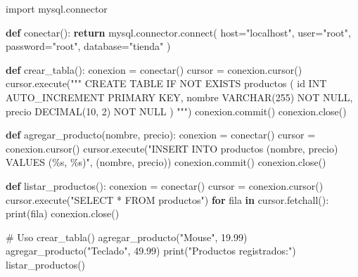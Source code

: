\documentclass[
  a4paper,
  DIV=11,
  numbers=noendperiod,
  onepage,
  openany]{scrreprt}
\newenvironment{Shaded}{\begin{snugshade}}{\end{snugshade}}
\newcommand{\BuiltInTok}[1]{\textcolor[rgb]{0.00,0.23,0.31}{#1}}
\newcommand{\CommentTok}[1]{\textcolor[rgb]{0.37,0.37,0.37}{#1}}
\newcommand{\ControlFlowTok}[1]{\textcolor[rgb]{0.00,0.23,0.31}{\textbf{#1}}}
\newcommand{\ExtensionTok}[1]{\textcolor[rgb]{0.00,0.23,0.31}{#1}}
\newcommand{\FloatTok}[1]{\textcolor[rgb]{0.68,0.00,0.00}{#1}}
\newcommand{\ImportTok}[1]{\textcolor[rgb]{0.00,0.46,0.62}{#1}}
\newcommand{\KeywordTok}[1]{\textcolor[rgb]{0.00,0.23,0.31}{\textbf{#1}}}
\newcommand{\NormalTok}[1]{\textcolor[rgb]{0.00,0.23,0.31}{#1}}
\newcommand{\OperatorTok}[1]{\textcolor[rgb]{0.37,0.37,0.37}{#1}}
\newcommand{\SpecialCharTok}[1]{\textcolor[rgb]{0.37,0.37,0.37}{#1}}
\newcommand{\StringTok}[1]{\textcolor[rgb]{0.13,0.47,0.30}{#1}}
\begin{document}
\begin{Shaded}
\begin{Highlighting}[]
\ImportTok{import}\NormalTok{ mysql.connector}

\KeywordTok{def}\NormalTok{ conectar():}
    \ControlFlowTok{return}\NormalTok{ mysql.connector.}\ExtensionTok{connect}\NormalTok{(}
\NormalTok{        host}\OperatorTok{=}\StringTok{"localhost"}\NormalTok{,}
\NormalTok{        user}\OperatorTok{=}\StringTok{"root"}\NormalTok{,}
\NormalTok{        password}\OperatorTok{=}\StringTok{"root"}\NormalTok{,}
\NormalTok{        database}\OperatorTok{=}\StringTok{"tienda"}
\NormalTok{    )}

\KeywordTok{def}\NormalTok{ crear\_tabla():}
\NormalTok{    conexion }\OperatorTok{=}\NormalTok{ conectar()}
\NormalTok{    cursor }\OperatorTok{=}\NormalTok{ conexion.cursor()}
\NormalTok{    cursor.execute(}\StringTok{"""}
\StringTok{    CREATE TABLE IF NOT EXISTS productos (}
\StringTok{        id INT AUTO\_INCREMENT PRIMARY KEY,}
\StringTok{        nombre VARCHAR(255) NOT NULL,}
\StringTok{        precio DECIMAL(10, 2) NOT NULL}
\StringTok{    )}
\StringTok{    """}\NormalTok{)}
\NormalTok{    conexion.commit()}
\NormalTok{    conexion.close()}

\KeywordTok{def}\NormalTok{ agregar\_producto(nombre, precio):}
\NormalTok{    conexion }\OperatorTok{=}\NormalTok{ conectar()}
\NormalTok{    cursor }\OperatorTok{=}\NormalTok{ conexion.cursor()}
\NormalTok{    cursor.execute(}\StringTok{"INSERT INTO productos (nombre, precio) VALUES (}\SpecialCharTok{\%s}\StringTok{, }\SpecialCharTok{\%s}\StringTok{)"}\NormalTok{, (nombre, precio))}
\NormalTok{    conexion.commit()}
\NormalTok{    conexion.close()}

\KeywordTok{def}\NormalTok{ listar\_productos():}
\NormalTok{    conexion }\OperatorTok{=}\NormalTok{ conectar()}
\NormalTok{    cursor }\OperatorTok{=}\NormalTok{ conexion.cursor()}
\NormalTok{    cursor.execute(}\StringTok{"SELECT * FROM productos"}\NormalTok{)}
    \ControlFlowTok{for}\NormalTok{ fila }\KeywordTok{in}\NormalTok{ cursor.fetchall():}
        \BuiltInTok{print}\NormalTok{(fila)}
\NormalTok{    conexion.close()}

\CommentTok{\# Uso}
\NormalTok{crear\_tabla()}
\NormalTok{agregar\_producto(}\StringTok{"Mouse"}\NormalTok{, }\FloatTok{19.99}\NormalTok{)}
\NormalTok{agregar\_producto(}\StringTok{"Teclado"}\NormalTok{, }\FloatTok{49.99}\NormalTok{)}
\BuiltInTok{print}\NormalTok{(}\StringTok{"Productos registrados:"}\NormalTok{)}
\NormalTok{listar\_productos()}
\end{Highlighting}
\end{Shaded}
\end{document}
